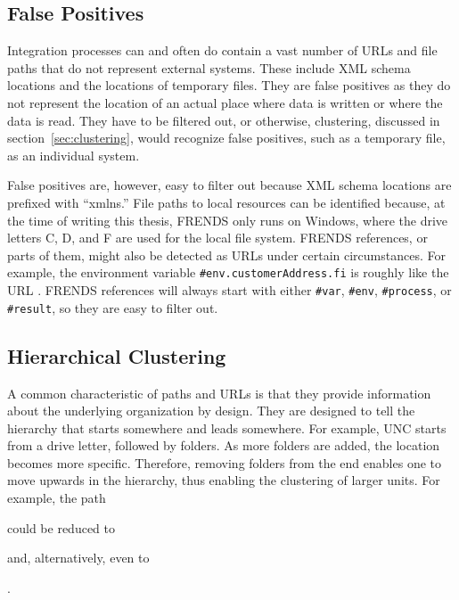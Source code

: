 \documentclass[english, 12pt, a4paper, sci, utf8, a-2b, online, obeyspaces]{aaltothesis}
\begin{document}
\subsection{False Positives}
\label{sec:false_positives}
Integration processes can and often do contain a vast number of URLs and file paths that do not represent external systems. These include XML schema locations and the locations of temporary files. They are false positives as they do not represent the location of an actual place where data is written or where the data is read. They have to be filtered out, or otherwise, clustering, discussed in section~\ref{sec:clustering}, would recognize false positives, such as a temporary file, as an individual system. 

False positives are, however, easy to filter out because XML schema locations are prefixed with “xmlns.” File paths to local resources can be identified because, at the time of writing this thesis, FRENDS only runs on Windows, where the drive letters C, D, and F are used for the local file system. FRENDS references, or parts of them, might also be detected as URLs under certain circumstances. For example, the environment variable \verb|#env.customerAddress.fi| is roughly like the URL . FRENDS references will always start with either \verb|#var|, \verb|#env|, \verb|#process|, or \verb|#result|, so they are easy to filter out.

\subsection{Hierarchical Clustering}
\label{hierarchical_clustering}
A common characteristic of paths and URLs is that they provide information about the underlying organization by design. They are designed to tell the hierarchy that starts somewhere and leads somewhere. For example, UNC starts from a drive letter, followed by folders. As more folders are added, the location becomes more specific. Therefore, removing folders from the end enables one to move upwards in the hierarchy, thus enabling the clustering of larger units. 
For example, the path
\begin{center}
\end{center}
could be reduced to 
\begin{center}
\end{center}
and, alternatively, even to
\begin{center}
    .
\end{center}
\end{document}

